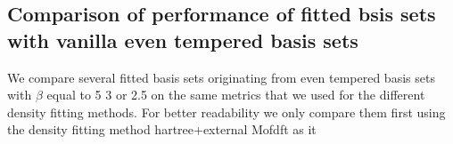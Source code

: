  \subsection{Comparison of performance of fitted bsis sets with vanilla even tempered basis sets}
 We compare several fitted basis sets originating from even tempered basis sets with $\beta$ equal to 5 3 or 2.5 on the same metrics that we used for the different density fitting methods. For better readability we only compare them first using the density fitting method hartree+external Mofdft as it   
 